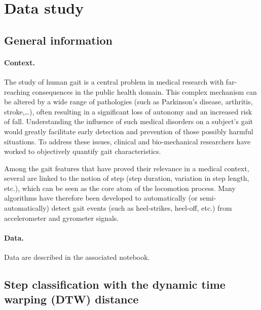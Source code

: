 \documentclass[11pt]{article}
\begin{document}
\section{Data study}

\subsection{General information}

\paragraph{Context.}
The study of human gait is a central problem in medical research with far-reaching consequences in the public health domain. This complex mechanism can be altered by a wide range of pathologies (such as Parkinson's disease, arthritis, stroke,\ldots), often resulting in a significant loss of autonomy and an increased risk of fall. Understanding the influence of such medical disorders on a subject's gait would greatly facilitate early detection and prevention of those possibly harmful situations. To address these issues, clinical and bio-mechanical researchers have worked to objectively quantify gait characteristics.

Among the gait features that have proved their relevance in a medical context, several are linked to the notion of step (step duration, variation in step length, etc.), which can be seen as the core atom of the locomotion process. Many algorithms have therefore been developed to automatically (or semi-automatically) detect gait events (such as heel-strikes, heel-off, etc.) from accelerometer and gyrometer signals.

\paragraph{Data.}
Data are described in the associated notebook.

\subsection{Step classification with the dynamic time warping (DTW) distance}
\end{document}
